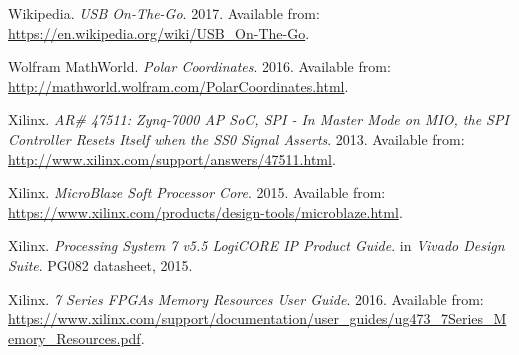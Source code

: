 \begin{thebibliography}{9}
Wikipedia. \textit{USB On-The-Go}. 2017. Available from: \url{https://en.wikipedia.org/wiki/USB_On-The-Go}.

Wolfram MathWorld. \textit{Polar Coordinates}. 2016. Available from: \url{http://mathworld.wolfram.com/PolarCoordinates.html}.

Xilinx. \textit{AR\# 47511: Zynq-7000 AP SoC, SPI - In Master Mode on MIO, the SPI Controller Resets Itself when the SS0 Signal Asserts}. 2013. Available from: \url{http://www.xilinx.com/support/answers/47511.html}.

Xilinx. \textit{MicroBlaze Soft Processor Core}. 2015. Available from: \url{https://www.xilinx.com/products/design-tools/microblaze.html}.

Xilinx. \textit{Processing System 7 v5.5 LogiCORE IP Product Guide}. in \textit{Vivado Design Suite}. PG082 datasheet, 2015.

Xilinx. \textit{7 Series FPGAs Memory Resources User Guide}. 2016. Available from: \url{https://www.xilinx.com/support/documentation/user_guides/ug473_7Series_Memory_Resources.pdf}.

\end{thebibliography}

